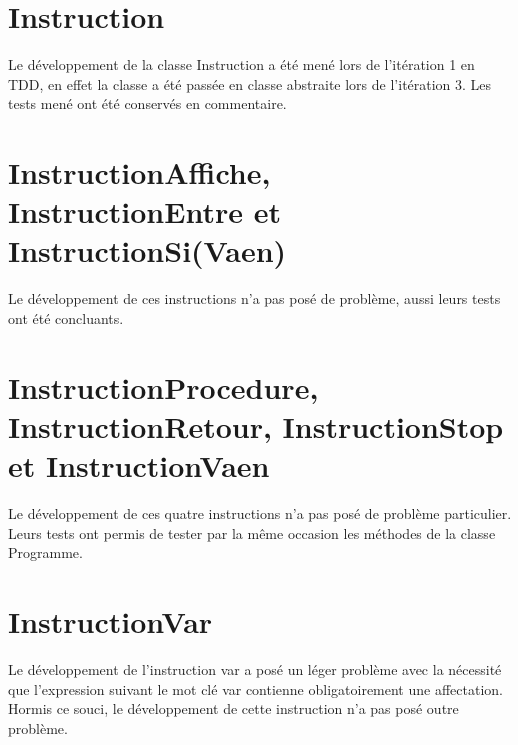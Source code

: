 
\section{Instruction}

Le développement de la classe Instruction a été mené lors de l'itération 1
en TDD, en effet la classe a été passée en classe abstraite lors de
l'itération 3. Les tests mené ont été conservés en commentaire.

\section{InstructionAffiche, InstructionEntre et InstructionSi(Vaen)}

Le développement de ces instructions n'a pas posé de problème, aussi leurs
tests ont été concluants.

\section{InstructionProcedure, InstructionRetour, InstructionStop et InstructionVaen}

Le développement de ces quatre instructions n'a pas posé de problème particulier.
Leurs tests ont permis de tester par la même occasion les méthodes de la classe
Programme.

\section{InstructionVar}

Le développement de l'instruction var a posé un léger problème avec la nécessité
que l'expression suivant le mot clé var contienne obligatoirement une affectation.
Hormis ce souci, le développement de cette instruction n'a pas posé outre problème.